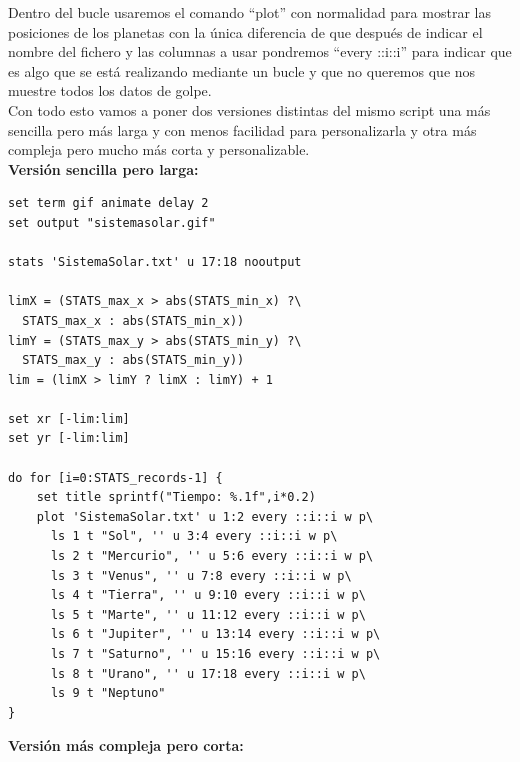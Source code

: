\documentclass[11pt,a4paper,twoside,pdf]{article}
\numberwithin{equation}{section}
\begin{document}
Dentro del bucle usaremos el comando ``plot'' con normalidad para mostrar las posiciones de los planetas con la única diferencia de que después de indicar el nombre del fichero y las columnas a usar pondremos ``every ::i::i'' para indicar que es algo que se está realizando mediante un bucle y que no queremos que nos muestre todos los datos de golpe. \\

Con todo esto vamos a poner dos versiones distintas del mismo script una más sencilla pero más larga y con menos facilidad para personalizarla y otra más compleja pero mucho más corta y personalizable. \\

\Large\textbf{Versión sencilla pero larga:}\normalsize

\begin{lstlisting}[language=Gnuplot]
set term gif animate delay 2
set output "sistemasolar.gif"

stats 'SistemaSolar.txt' u 17:18 nooutput

limX = (STATS_max_x > abs(STATS_min_x) ?\
  STATS_max_x : abs(STATS_min_x))
limY = (STATS_max_y > abs(STATS_min_y) ?\
  STATS_max_y : abs(STATS_min_y))
lim = (limX > limY ? limX : limY) + 1

set xr [-lim:lim]
set yr [-lim:lim]

do for [i=0:STATS_records-1] {
    set title sprintf("Tiempo: %.1f",i*0.2)
    plot 'SistemaSolar.txt' u 1:2 every ::i::i w p\
      ls 1 t "Sol", '' u 3:4 every ::i::i w p\
      ls 2 t "Mercurio", '' u 5:6 every ::i::i w p\
      ls 3 t "Venus", '' u 7:8 every ::i::i w p\
      ls 4 t "Tierra", '' u 9:10 every ::i::i w p\
      ls 5 t "Marte", '' u 11:12 every ::i::i w p\
      ls 6 t "Jupiter", '' u 13:14 every ::i::i w p\
      ls 7 t "Saturno", '' u 15:16 every ::i::i w p\
      ls 8 t "Urano", '' u 17:18 every ::i::i w p\
      ls 9 t "Neptuno"
}

\end{lstlisting}

\hspace{60pt}

\Large\textbf{Versión más compleja pero corta:}\normalsize
\end{document}
